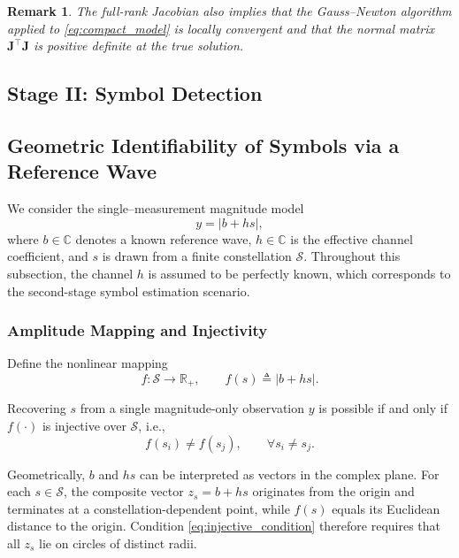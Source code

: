 \documentclass[journal]{IEEEtran}
\newtheorem{remark}{Remark}
\begin{document}
\begin{remark}
The full-rank Jacobian also implies that the Gauss--Newton algorithm
applied to \eqref{eq:compact_model} is locally convergent and that the
normal matrix $\mathbf J^{\top}\mathbf J$ is positive definite at the
true solution.
\end{remark}


\subsection{Stage II: Symbol Detection}
\subsection{Geometric Identifiability of Symbols via a Reference Wave}
\label{subsec:refwave_identifiability}

We consider the single–measurement magnitude model
\begin{equation}
y = \left| b + h s \right|,
\label{eq:refwave_model}
\end{equation}
where $b\in\mathbb{C}$ denotes a known reference wave, $h\in\mathbb{C}$ is the effective channel coefficient, and $s$ is drawn from a finite constellation $\mathcal{S}$.
Throughout this subsection, the channel $h$ is assumed to be perfectly known, which corresponds to the second-stage symbol estimation scenario.

\subsubsection{Amplitude Mapping and Injectivity}

Define the nonlinear mapping
\begin{equation}
f : \mathcal{S} \rightarrow \mathbb{R}_{+}, 
\qquad
f(s) \triangleq \left| b + h s \right|.
\label{eq:amp_mapping}
\end{equation}

Recovering $s$ from a single magnitude-only observation $y$ is possible if and only if $f(\cdot)$ is injective over $\mathcal{S}$, i.e.,
\begin{equation}
f(s_i) \neq f(s_j), \qquad \forall s_i \neq s_j.
\label{eq:injective_condition}
\end{equation}

Geometrically, $b$ and $hs$ can be interpreted as vectors in the complex plane.
For each $s\in\mathcal{S}$, the composite vector $z_s = b + h s$ originates from the origin and terminates at a constellation-dependent point, while $f(s)$ equals its Euclidean distance to the origin.
Condition \eqref{eq:injective_condition} therefore requires that all $z_s$ lie on circles of distinct radii.
\end{document}
